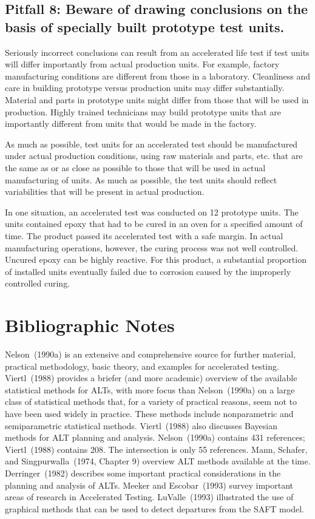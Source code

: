\subsection{Pitfall 8: Beware of drawing conclusions
on the basis of specially built prototype test units.}

Seriously incorrect conclusions can result from an accelerated life
test if test units will differ importantly from actual production
units.  For example, factory manufacturing conditions are different
from those in a laboratory. Cleanliness and care in building 
prototype versus production units may
differ substantially. Material and parts in prototype units might
differ from those that will be used in production. Highly trained
technicians may build prototype units that are importantly different
from units that would be made in the factory.

As much as possible, test units for an accelerated test should be
manufactured under actual production conditions, using raw materials
and parts, etc. that are the same as or as close as possible to
those that will be used in actual manufacturing of units. As much as
possible, the test units should reflect variabilities that will be
present in actual production.

In one situation, an accelerated test was conducted on 12 prototype
units.  The units contained epoxy that had to be cured in an oven
for a specified amount of time. The product passed its accelerated
test with a safe margin. In actual manufacturing operations,
however, the curing process was not well controlled. Uncured epoxy
can be highly reactive. For this product, a substantial proportion
of installed units eventually failed due to corrosion caused by
the improperly controlled curing.

\section*{Bibliographic Notes}
Nelson~(1990a) is an extensive and comprehensive source for further
material, practical methodology, basic theory, and examples for
accelerated testing.  Viertl~(1988) provides a briefer (and more
academic) overview of the available statistical methods for ALTs,
with more focus than Nelson~(1990a) on a large class of statistical
methods that, for a variety of practical reasons, seem not to have
been used widely in practice.  These methods include nonparametric
and semiparametric statistical methods. Viertl~(1988) also discusses
Bayesian methods for ALT planning and analysis.  Nelson~(1990a)
contains 431 references; Viertl~(1988) contains 208.  The
intersection is only 55 references.  Mann, Schafer, and
Singpurwalla~(1974, Chapter 9) overview ALT methods available at the
time.  Derringer~(1982) describes some important practical
considerations in the planning and analysis of ALTs. Meeker and
Escobar~(1993) survey important areas of research in Accelerated
Testing. LuValle~(1993) illustrated the use of graphical methods
that can be used to detect departures from the SAFT model.

